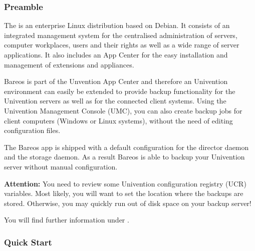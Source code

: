 \subsubsection{Preamble}

The  is an enterprise Linux distribution based on Debian. It consists of an integrated management system for the centralised administration of servers, computer workplaces, users and their rights as well as a wide range of server applications. It also includes an App Center for the easy installation and management of extensions and appliances.

Bareos is part of the Unvention App Center and therefore an Univention environment can easily be extended to provide backup functionality for the Univention servers as well as for the connected client systems. Using the Univention Management Console (UMC), you can also create backup jobs for client computers (Windows or Linux systems), without the need of editing configuration files.

The Bareos app is shipped with a default configuration for the director daemon and the storage daemon. As a result Bareos is able to backup your Univention server without manual configuration.

\textbf{Attention:} You need to review some Univention configuration registry (UCR) variables. Most likely, you will want to set the location where the backups are stored. Otherwise, you may quickly run out of disk space on your backup server!

You will find further information under .

\subsubsection{Quick Start}


